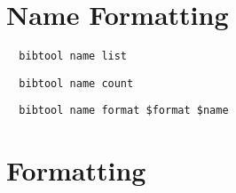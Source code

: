 \section{Name Formatting}


\begin{verbatim}
  bibtool name list
\end{verbatim}

\INCOMPLETE

\begin{verbatim}
  bibtool name count
\end{verbatim}

\INCOMPLETE


\begin{verbatim}
  bibtool name format $format $name
\end{verbatim}

\INCOMPLETE


\section{Formatting}

